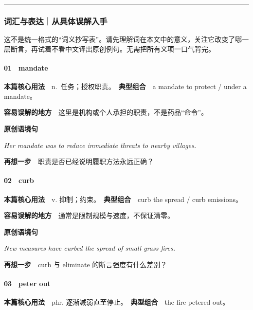 \documentclass[
  11pt,
]{ctexart}
\renewenvironment{quote}{\begin{tcolorbox}[enhanced,breakable,colback=sand,colframe=primary!22,boxrule=0.4pt,arc=2pt,left=2.6mm,right=2.6mm,top=1.6mm,bottom=1.6mm]\itshape}{\end{tcolorbox}}
\begin{document}
\rule{0.75\linewidth}{0.35pt}

\subsubsection{词汇与表达｜从具体误解入手}\label{ux8bcdux6c47ux4e0eux8868ux8fbeux4eceux5177ux4f53ux8befux89e3ux5165ux624b-1}

这不是统一格式的``词义抄写表''。请先理解词在本文中的意义，关注它改变了哪一层断言，再试着不看中文译出原创例句。无需把所有义项一口气背完。

\paragraph{01　mandate}\label{mandate}

\textbf{本篇核心用法}　n.~任务；授权职责。　\textbf{典型组合}　a mandate
to protect / under a mandate。

\textbf{容易误解的地方}　这里是机构或个人承担的职责，不是药品``命令''。

\textbf{原创语境句}

\begin{quote}
Her mandate was to reduce immediate threats to nearby villages.
\end{quote}

\textbf{再想一步}　职责是否已经说明履职方法永远正确？

\paragraph{02　curb}\label{curb}

\textbf{本篇核心用法}　v. 抑制；约束。　\textbf{典型组合}　curb the
spread / curb emissions。

\textbf{容易误解的地方}　通常是限制规模与速度，不保证清零。

\textbf{原创语境句}

\begin{quote}
New measures have curbed the spread of small grass fires.
\end{quote}

\textbf{再想一步}　curb 与 eliminate 的断言强度有什么差别？

\paragraph{03　peter out}\label{peter-out}

\textbf{本篇核心用法}　phr. 逐渐减弱直至停止。　\textbf{典型组合}　the
fire petered out。
\end{document}
